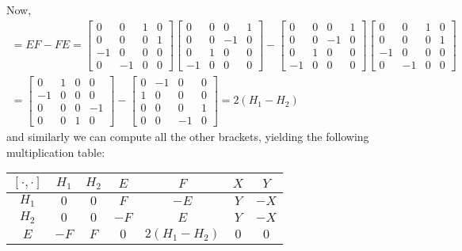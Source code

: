 \begin{example}
	Now,
	\begin{multline*}
		[E,F] = EF-FE = \begin{bmatrix}
			0 & 0 & 1 & 0 \\
			0 & 0 & 0 & 1 \\
			-1 & 0 & 0 & 0 \\
			0 & -1 & 0 & 0
 		\end{bmatrix} \begin{bmatrix}
			0 & 0 & 0 & 1 \\
			0 & 0 & -1 & 0 \\
			0 & 1 & 0 & 0 \\
			-1 & 0 & 0 & 0
 		\end{bmatrix} - \begin{bmatrix}
			0 & 0 & 0 & 1 \\
			0 & 0 & -1 & 0 \\
			0 & 1 & 0 & 0 \\
			-1 & 0 & 0 & 0
 		\end{bmatrix}\begin{bmatrix}
			0 & 0 & 1 & 0 \\
			0 & 0 & 0 & 1 \\
			-1 & 0 & 0 & 0 \\
			0 & -1 & 0 & 0
 		\end{bmatrix} \\
		= \begin{bmatrix}
			0 & 1 & 0 & 0 \\
			-1 & 0 & 0 & 0 \\
			0 & 0 & 0 & -1 \\
			0 & 0 & 1 & 0
 		\end{bmatrix} - \begin{bmatrix}
			0 & -1 & 0 & 0 \\
			1 & 0 & 0 & 0 \\
			0 & 0 & 0 & 1 \\
			0 & 0 & -1 & 0
 		\end{bmatrix} = 2(H_1 - H_2)
	\end{multline*}
	and similarly we can compute all the other brackets, yielding the following multiplication table:
	\begin{center}
		\begin{tabular}{c|cccccc}
			$[\cdot,\cdot]$ & $H_1$ & $H_2$ & $E$ & $F$ & $X$ & $Y$ \\
			\hline
			$H_1$ & $0$ & $0$ & $F$ & $-E$ & $Y$ & $-X$ \\
			$H_2$ & $0$ & $0$ & $-F$ & $E$ & $Y$ & $-X$ \\
			$E$ & $-F$ & $F$ & $0$ & $2(H_1-H_2)$ & $0$ & $0$ \\

\end{tabular}
\end{center}
\end{example}
